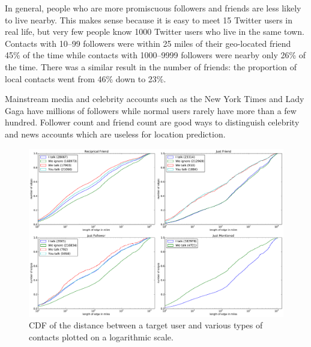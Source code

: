 \documentclass[letterpaper]{article}
\begin{document}
In general, people who are more promiscuous followers and friends are less
likely to live nearby.
%
This makes sense because it is easy to meet 15 Twitter users in real life, but
very few people know 1000 Twitter users who live in the same town.
%
Contacts with 10--99 followers were within 25 miles of their geo-located friend
45\% of the time while contacts with 1000--9999 followers were nearby only 26\%
of the time.
%
There was a similar result in the number of friends: the proportion of local
contacts went from 46\% down to 23\%.

Mainstream media and celebrity accounts such as the New York Times and Lady
Gaga have millions of followers while normal users rarely have more than a few
hundred.
%
Follower count and friend count are good ways to distinguish celebrity and news
accounts which are useless for location prediction.

\ifdefined\THESIS
    \begin{figure}[tbh]
    \centering
    \includegraphics[width=.9\linewidth]{figures/com_types.pdf}
    \caption{
    CDF of the distance between a target user and various types of contacts
    plotted on a logarithmic scale.
    }
    \label{fig:ComTypes}
    \end{figure}
\fi
\end{document}
